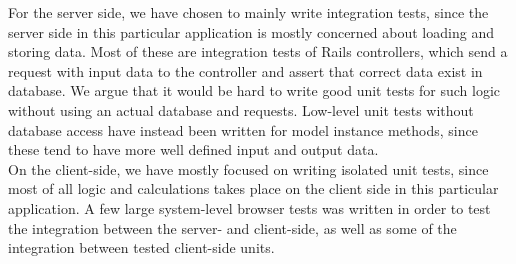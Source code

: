 
For the server side, we have chosen to mainly write integration
tests, since the server side in this particular application is mostly
concerned about loading and storing data. Most of these are integration
tests of Rails controllers, which send a request with input data to the
controller and assert that correct data exist in database. We argue
that it would be hard to write good unit tests for such logic
without using an actual database and requests. Low-level unit tests
without database access have instead been written for model instance
methods, since these tend to have more well defined input and output
data.\\

On the client-side, we have mostly focused on writing isolated unit tests,
since most of all logic and calculations takes place on the
client side in this particular application. A few large system-level
browser tests was written in order to test the integration between the
server- and client-side, as well as some of the integration between
tested client-side units.\\
